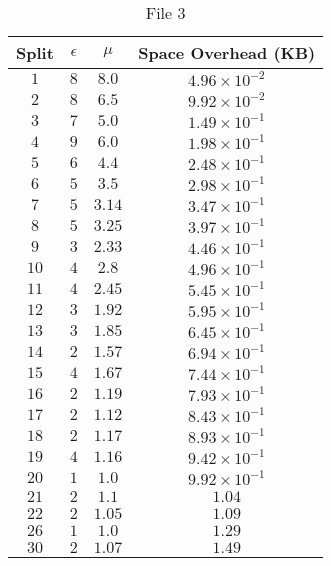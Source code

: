 \begin{center}
	\begin{table}
	\caption{File 3}\label{tab:n1}
	\begin{center}
		\begin{tabular}{ c | c | c | c }
		\hline
		Split & $\epsilon$ & $\mu$ & Space Overhead (KB) \\ \hline
		\hline
		$1$ & $8$ & $8.0$ & $4.96\times 10^{-2}$ \\ 
		$2$ & $8$ & $6.5$ & $9.92\times 10^{-2}$ \\ 
		$3$ & $7$ & $5.0$ & $1.49\times 10^{-1}$ \\ 
		$4$ & $9$ & $6.0$ & $1.98\times 10^{-1}$ \\ 
		$5$ & $6$ & $4.4$ & $2.48\times 10^{-1}$ \\ 
		$6$ & $5$ & $3.5$ & $2.98\times 10^{-1}$ \\ 
		$7$ & $5$ & $3.14$ & $3.47\times 10^{-1}$ \\ 
		$8$ & $5$ & $3.25$ & $3.97\times 10^{-1}$ \\ 
		$9$ & $3$ & $2.33$ & $4.46\times 10^{-1}$ \\ 
		$10$ & $4$ & $2.8$ & $4.96\times 10^{-1}$ \\ 
		$11$ & $4$ & $2.45$ & $5.45\times 10^{-1}$ \\ 
		$12$ & $3$ & $1.92$ & $5.95\times 10^{-1}$ \\ 
		$13$ & $3$ & $1.85$ & $6.45\times 10^{-1}$ \\ 
		$14$ & $2$ & $1.57$ & $6.94\times 10^{-1}$ \\ 
		$15$ & $4$ & $1.67$ & $7.44\times 10^{-1}$ \\ 
		$16$ & $2$ & $1.19$ & $7.93\times 10^{-1}$ \\ 
		$17$ & $2$ & $1.12$ & $8.43\times 10^{-1}$ \\ 
		$18$ & $2$ & $1.17$ & $8.93\times 10^{-1}$ \\ 
		$19$ & $4$ & $1.16$ & $9.42\times 10^{-1}$ \\ 
		$20$ & $1$ & $1.0$ & $9.92\times 10^{-1}$ \\ 
		$21$ & $2$ & $1.1$ & $1.04$ \\ 
		$22$ & $2$ & $1.05$ & $1.09$ \\ 
		$26$ & $1$ & $1.0$ & $1.29$ \\ 
		$30$ & $2$ & $1.07$ & $1.49$ \\ 
		 
		
		\hline  
		

\end{tabular}
\end{center}
\end{table}
\end{center}
